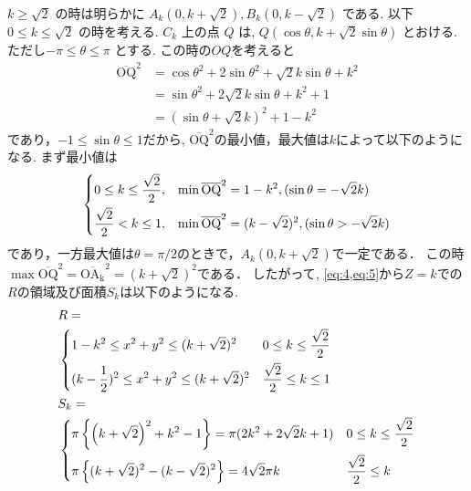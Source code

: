\documentclass[a4paper,10pt]{ltjsarticle}
\begin{document}
\begin{multicols}{2}
  $k \ge \sqrt{2}$ の時は明らかに $A_k(0, k+\sqrt{2}), B_k(0, k-\sqrt{2})$ である.
  以下 $0 \le k \le \sqrt{2}$ の時を考える.
  $C_k$ 上の点 $Q$ は, $Q(\cos\theta, k+\sqrt{2}\sin\theta)$ とおける.
  ただし$-\pi \le \theta \le \pi$ とする.
  この時の$OQ$を考えると
  \begin{align*}
    \overline{\text{OQ}}^2
     & = \cos\theta^2+2\sin\theta^2+\sqrt{2}k\sin\theta+k^2 \\
     & = \sin\theta^2+2\sqrt{2}k\sin\theta+k^2+1            \\
     & = (\sin\theta+\sqrt{2}k)^2+1-k^2
  \end{align*}
  であり，$-1 \le \sin\theta \le 1$だから,
  $\overline{\text{OQ}}^2$の最小値，最大値は$k$によって以下のようになる.
  まず最小値は
  \begin{align}\label{eq:5}
    \begin{dcases}
      0 \le k \le \frac{\sqrt{2}}{2}, & \min \overline{\text{OQ}}^2 = 1-k^2, (\sin\theta=-\sqrt{2}k)          \\
      \frac{\sqrt{2}}{2} < k \le 1,   & \min \overline{\text{OQ}}^2 = (k-\sqrt{2})^2, (\sin\theta>-\sqrt{2}k)
    \end{dcases}
  \end{align}
  であり，一方最大値は$\theta=\pi/2$のときで，$A_k(0, k+\sqrt{2})$で一定である．
  この時$\max \overline{\text{OQ}}^2 = \overline{\mathrm{OA_k}}^2 = (k+\sqrt{2})^2$である．
  したがって, \cref{eq:4,eq:5}から$Z=k$での$R$の領域及び面積$S_k$は以下のようになる.
  \begin{align}
     & R =      \nonumber                                                                                                               \\
     & \begin{dcases}
         1-k^2 \le x^2+y^2 \le (k+\sqrt{2})^2             & 0 \le k \le \frac{\sqrt{2}}{2} \\
         (k-\frac{1}{2})^2 \le x^2+y^2 \le (k+\sqrt{2})^2 & \frac{\sqrt{2}}{2} \le k \le 1
       \end{dcases} \label{eq:6}                                 \\
     & S_k=               \nonumber                                                                                                     \\
     & \begin{dcases}
         \pi \left\{ \left(k+\sqrt{2}\right)^2 + k^2 - 1 \right\} = \pi (2k^2+2\sqrt{2}k+1) & 0\le k\le \frac{\sqrt{2}}{2} \\
         \pi \left\{ (k+\sqrt{2})^2-(k-\sqrt{2})^2 \right\} = 4\sqrt{2}\pi k                & \frac{\sqrt{2}}{2} \le k
       \end{dcases} \label{eq:7}
  \end{align}


\end{multicols}
\end{document}
